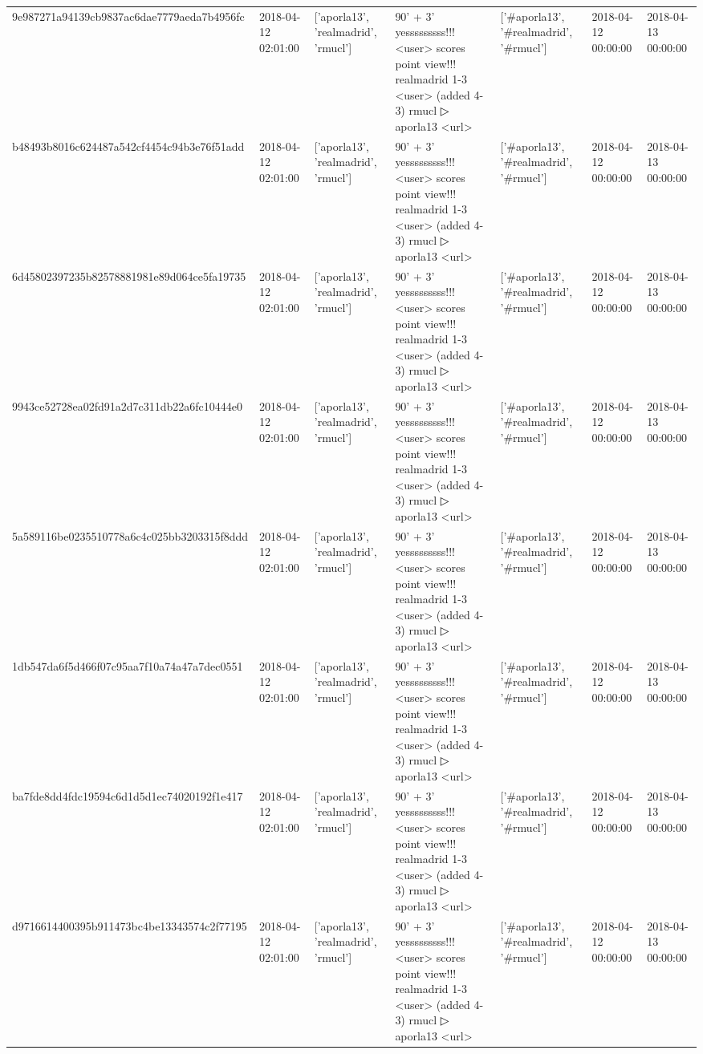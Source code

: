 \begin{tabular}{lllllll}
9e987271a94139cb9837ac6dae7779aeda7b4956fc & 2018-04-12 02:01:00 & ['aporla13', 'realmadrid', 'rmucl'] & 90' + 3' yesssssssss!!! <user> scores point view!!! realmadrid 1-3 <user> (added 4-3) rmucl ▷ aporla13 <url> & ['#aporla13', '#realmadrid', '#rmucl'] & 2018-04-12 00:00:00 & 2018-04-13 00:00:00 \\
b48493b8016c624487a542cf4454c94b3e76f51add & 2018-04-12 02:01:00 & ['aporla13', 'realmadrid', 'rmucl'] & 90' + 3' yesssssssss!!! <user> scores point view!!! realmadrid 1-3 <user> (added 4-3) rmucl ▷ aporla13 <url> & ['#aporla13', '#realmadrid', '#rmucl'] & 2018-04-12 00:00:00 & 2018-04-13 00:00:00 \\
6d45802397235b82578881981e89d064ce5fa19735 & 2018-04-12 02:01:00 & ['aporla13', 'realmadrid', 'rmucl'] & 90' + 3' yesssssssss!!! <user> scores point view!!! realmadrid 1-3 <user> (added 4-3) rmucl ▷ aporla13 <url> & ['#aporla13', '#realmadrid', '#rmucl'] & 2018-04-12 00:00:00 & 2018-04-13 00:00:00 \\
9943ce52728ea02fd91a2d7c311db22a6fc10444e0 & 2018-04-12 02:01:00 & ['aporla13', 'realmadrid', 'rmucl'] & 90' + 3' yesssssssss!!! <user> scores point view!!! realmadrid 1-3 <user> (added 4-3) rmucl ▷ aporla13 <url> & ['#aporla13', '#realmadrid', '#rmucl'] & 2018-04-12 00:00:00 & 2018-04-13 00:00:00 \\
5a589116be0235510778a6c4c025bb3203315f8ddd & 2018-04-12 02:01:00 & ['aporla13', 'realmadrid', 'rmucl'] & 90' + 3' yesssssssss!!! <user> scores point view!!! realmadrid 1-3 <user> (added 4-3) rmucl ▷ aporla13 <url> & ['#aporla13', '#realmadrid', '#rmucl'] & 2018-04-12 00:00:00 & 2018-04-13 00:00:00 \\
1db547da6f5d466f07c95aa7f10a74a47a7dec0551 & 2018-04-12 02:01:00 & ['aporla13', 'realmadrid', 'rmucl'] & 90' + 3' yesssssssss!!! <user> scores point view!!! realmadrid 1-3 <user> (added 4-3) rmucl ▷ aporla13 <url> & ['#aporla13', '#realmadrid', '#rmucl'] & 2018-04-12 00:00:00 & 2018-04-13 00:00:00 \\
ba7fde8dd4fdc19594c6d1d5d1ec74020192f1e417 & 2018-04-12 02:01:00 & ['aporla13', 'realmadrid', 'rmucl'] & 90' + 3' yesssssssss!!! <user> scores point view!!! realmadrid 1-3 <user> (added 4-3) rmucl ▷ aporla13 <url> & ['#aporla13', '#realmadrid', '#rmucl'] & 2018-04-12 00:00:00 & 2018-04-13 00:00:00 \\
d9716614400395b911473bc4be13343574c2f77195 & 2018-04-12 02:01:00 & ['aporla13', 'realmadrid', 'rmucl'] & 90' + 3' yesssssssss!!! <user> scores point view!!! realmadrid 1-3 <user> (added 4-3) rmucl ▷ aporla13 <url> & ['#aporla13', '#realmadrid', '#rmucl'] & 2018-04-12 00:00:00 & 2018-04-13 00:00:00 \\

\end{tabular}
